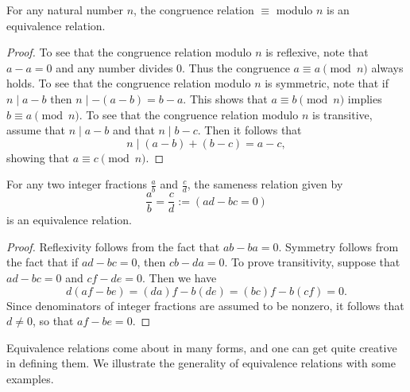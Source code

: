 \begin{proposition}
  For any natural number $n$, the congruence relation $\equiv$ modulo $n$ is an equivalence relation.
\end{proposition}

\begin{proof}
  To see that the congruence relation modulo $n$ is reflexive, note that $a-a=0$ and any number divides $0$. Thus the congruence $a\equiv a\pmod{n}$ always holds. To see that the congruence relation modulo $n$ is symmetric, note that if $n\mid a-b$ then $n\mid -(a-b)=b-a$. This shows that $a\equiv b\pmod{n}$ implies $b\equiv a\pmod{n}$. To see that the congruence relation modulo $n$ is transitive, assume that $n\mid a-b$ and that $n\mid b-c$. Then it follows that
  \begin{equation*}
    n\mid (a-b)+(b-c)=a-c,
  \end{equation*}
  showing that $a\equiv c\pmod{n}$.
\end{proof}

\begin{proposition}
  For any two integer fractions $\frac{a}{b}$ and $\frac{c}{d}$, the sameness relation given by
  \begin{equation*}
    \frac{a}{b}=\frac{c}{d} := (ad-bc=0)
  \end{equation*}
  is an equivalence relation.
\end{proposition}

\begin{proof}
  Reflexivity follows from the fact that $ab-ba=0$. Symmetry follows from the fact that if $ad-bc=0$, then $cb-da=0$. To prove transitivity, suppose that
  $ad-bc=0$ and $cf-de=0$. Then we have
  \begin{equation*}
    d(af-be)=(da)f-b(de)=(bc)f-b(cf)=0.
  \end{equation*}
  Since denominators of integer fractions are assumed to be nonzero, it follows that $d\neq 0$, so that $af-be=0$.
\end{proof}

Equivalence relations come about in many forms, and one can get quite creative in defining them. We illustrate the generality of equivalence relations with some examples.



